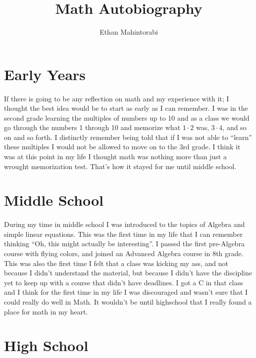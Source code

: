 \documentclass{article}
\begin{document}
  
  \title{Math Autobiography}
  \author{Ethan Mahintorabi}
  
  \maketitle

  
  \section*{Early Years}
    \paragraph{}
        If there is going to be any reflection on math and my experience with it; I thought the best idea would be to start as early as I can remember. I was in the second grade learning the multiples of numbers up to 10 and as a class we would go through the numbers 1 through 10 and memorize what $1 \cdot 2$ was, $3 \cdot 4$, and so on and so forth. I distinctly remember being told that if I was not able to ``learn'' these multiples I would not be allowed to move on to the 3rd grade. I think it was at this point in my life I thought math was nothing more than just a wrought memorization test. That's how it stayed for me until middle school.

  \section*{Middle School}
    \paragraph{}
      During my time in middle school I was introduced to the topics of Algebra and simple linear equations. This was the first time in my life that I can remember thinking ``Oh, this might actually be interesting''. I passed the first pre-Algebra course with flying colors, and joined an Advanced Algebra course in 8th grade. This was also the first time I felt that a class was kicking my ass, and not because I didn't understand the material, but because I didn't have the discipline yet to keep up with a course that didn't have deadlines. I got a C in that class and I think for the first time in my life I was discouraged and wasn't sure that I could really do well in Math. It wouldn't be until highschool that I really found a place for math in my heart.
  
  \section*{High School}
\end{document}
